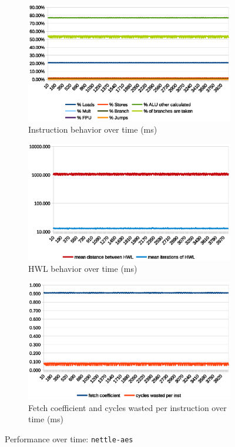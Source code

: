 \documentclass[../bachelor_paper.tex]{subfiles}
\begin{document}
\begin{figure}
    \begin{subfigure}{0.45\textwidth}
        \includegraphics[width=\textwidth]{img/graph/embench/nettle-aes_inst.eps}
        \caption{Instruction behavior over time (ms)}
    \end{subfigure}
    \begin{subfigure}{0.45\textwidth}
        \includegraphics[width=\textwidth]{img/graph/embench/nettle-aes_hwl.eps}
        \caption{\ac{HWL} behavior over time (ms)}
    \end{subfigure}
    \begin{subfigure}{0.45\textwidth}
        \includegraphics[width=\textwidth]{img/graph/embench/nettle-aes_fetch_waste.eps}
        \caption{Fetch coefficient and cycles wasted per instruction over time (ms)}
    \end{subfigure}
    \caption{Performance over time: \texttt{nettle-aes}}
\end{figure}
\end{document}
